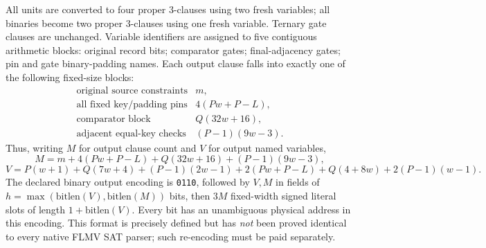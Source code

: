 \documentclass[11pt]{article}
\begin{document}
All units are converted to four proper 3-clauses using two fresh variables;
all binaries become two proper 3-clauses using one fresh variable. Ternary
gate clauses are unchanged. Variable identifiers are assigned to five
contiguous arithmetic blocks: original record bits; comparator gates;
final-adjacency gates; pin and gate binary-padding names. Each output clause
falls into exactly one of the following fixed-size blocks:
\[
\begin{array}{ll}
\text{original source constraints} & m,\\
\text{all fixed key/padding pins} &4(Pw+P-L),\\
\text{comparator block} &Q(32w+16),\\
\text{adjacent equal-key checks} &(P-1)(9w-3).
\end{array}
\]
Thus, writing $M$ for output clause count and $V$ for output named variables,
\[
 M=m+4(Pw+P-L)+Q(32w+16)+(P-1)(9w-3),
\]
\[
 V=P(w+1)+Q(7w+4)+(P-1)(2w-1)
 +2(Pw+P-L)+Q(4+8w)+2(P-1)(w-1).
\]
The declared binary output encoding is \texttt{0110}, followed by $V,M$
in fields of $h=\max(\mathrm{bitlen}(V),\mathrm{bitlen}(M))$ bits, then
$3M$ fixed-width signed literal slots of length $1+\mathrm{bitlen}(V)$.
Every bit has an unambiguous physical address in this encoding. This
format is precisely defined but has \emph{not} been proved identical to
every native FLMV SAT parser; such re-encoding must be paid separately.
\end{document}
